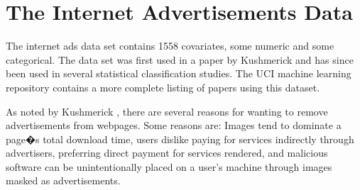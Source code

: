 \section{The Internet Advertisements Data}

The internet ads data set contains 1558 covariates, some numeric and some categorical. The data set was first used in a paper by Kushmerick \cite{kushmerick1999learning} and has since been used in several statistical classification studies. The UCI machine learning repository contains a more complete listing of papers using this dataset. 

As noted by Kushmerick \cite{kushmerick1999learning}, there are several reasons for wanting to remove advertisements from webpages. Some reasons are: Images tend to dominate a page�s total download time, users dislike paying for services indirectly through advertisers, preferring direct payment for services rendered, and malicious software can be unintentionally placed on a user's machine through images masked as advertisements. 

